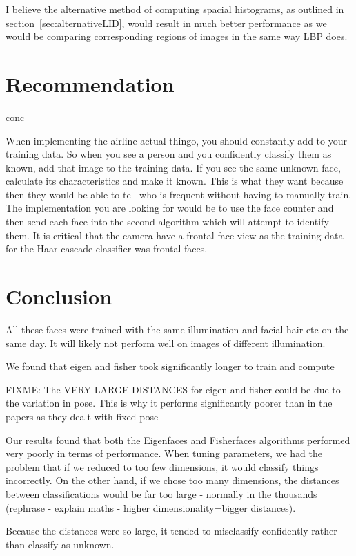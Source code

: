 \documentclass{article}
\begin{document}
I believe the alternative method of computing spacial histograms, as outlined in section~\ref{sec:alternativeLID}, would result in much better performance as we would be comparing corresponding regions of images in the same way LBP does.


\section{Recommendation}
conc

When implementing the airline actual thingo, you should constantly add to your training data.
So when you see a person and you confidently classify them as known, add that image to the training data.
If you see the same unknown face, calculate its characteristics and make it known. This is what they want because then they would be able to tell who is frequent without having to manually train.
The implementation you are looking for would be to use the face counter and then send each face into the second algorithm which will attempt to identify them.
It is critical that the camera have a frontal face view as the training data for the Haar cascade classifier was frontal faces.


\section{Conclusion}
All these faces were trained with the same illumination and facial hair etc on the same day. It will likely not perform well on images of different illumination.

We found that eigen and fisher took significantly longer to train and compute

FIXME: The VERY LARGE DISTANCES for eigen and fisher could be due to the variation in pose. This is why it performs significantly poorer than in the papers as they dealt with fixed pose

Our results found that both the Eigenfaces and Fisherfaces algorithms performed very poorly in terms of performance. When tuning parameters, we had the problem that if we reduced to too few dimensions, it would classify things incorrectly. On the other hand, if we chose too many dimensions, the distances between classifications would be far too large - normally in the thousands (rephrase - explain maths - higher dimensionality=bigger distances).

Because the distances were so large, it tended to misclassify confidently rather than classify as unknown.
\end{document}
